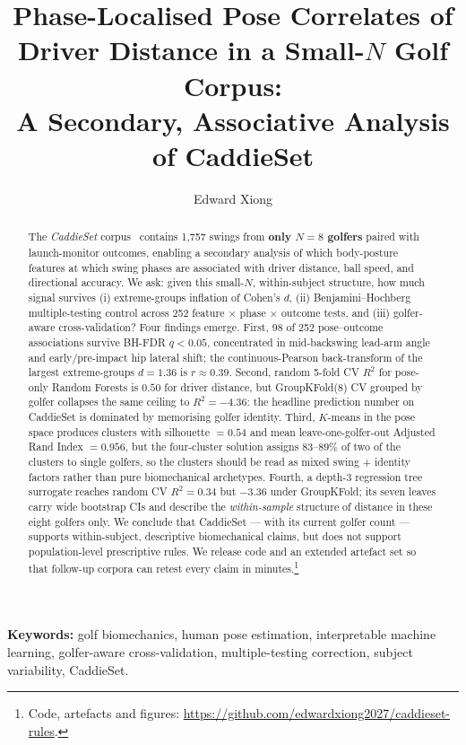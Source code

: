 \documentclass[11pt,a4paper]{article}
\title{\textbf{Phase-Localised Pose Correlates of Driver Distance in a Small-$N$ Golf Corpus:\\[2pt]
A Secondary, Associative Analysis of CaddieSet}}
\author[1]{Edward Xiong}
\affil[1]{Independent Research}
\date{}
\begin{document}
\maketitle

\begin{abstract}
\noindent
The \emph{CaddieSet} corpus~\citep{jung2025caddieset} contains 1{,}757 swings from \textbf{only $N=8$ golfers}
paired with launch-monitor outcomes, enabling a secondary analysis of which body-posture features at which swing
phases are associated with driver distance, ball speed, and directional accuracy.  We ask: given this small-$N$,
within-subject structure, how much signal survives (i) extreme-groups inflation of Cohen's $d$, (ii)
Benjamini--Hochberg multiple-testing control across 252 feature $\times$ phase $\times$ outcome tests, and
(iii) golfer-aware cross-validation?  Four findings emerge.  First, 98 of 252 pose--outcome associations survive
BH-FDR $q<0.05$, concentrated in mid-backswing lead-arm angle and early/pre-impact hip lateral shift; the
continuous-Pearson back-transform of the largest extreme-groups $d=1.36$ is $r\approx0.39$.  Second, random
5-fold CV $R^2$ for pose-only Random Forests is $0.50$ for driver distance, but GroupKFold(8) CV grouped by
golfer collapses the same ceiling to $R^2=-4.36$: the headline prediction number on CaddieSet is dominated by
memorising golfer identity.  Third, $K$-means in the pose space produces clusters with silhouette $=0.54$ and
mean leave-one-golfer-out Adjusted Rand Index $=0.956$, but the four-cluster solution assigns $83$--$89\%$ of
two of the clusters to single golfers, so the clusters should be read as mixed swing + identity factors rather
than pure biomechanical archetypes.  Fourth, a depth-3 regression tree surrogate reaches random CV $R^2=0.34$
but $-3.36$ under GroupKFold; its seven leaves carry wide bootstrap CIs and describe the \emph{within-sample}
structure of distance in these eight golfers only.  We conclude that CaddieSet --- with its current golfer
count --- supports within-subject, descriptive biomechanical claims, but does not support population-level
prescriptive rules.  We release code and an extended artefact set so that follow-up corpora can retest every
claim in minutes.\footnote{Code, artefacts and figures:
\url{https://github.com/edwardxiong2027/caddieset-rules}.}
\end{abstract}

\vspace{0.8em}
\begin{center}
\begin{tcolorbox}[colback=gray!5,colframe=gray!40,width=0.96\linewidth]
\small
\textbf{Keywords:} golf biomechanics, human pose estimation, interpretable machine learning, golfer-aware
cross-validation, multiple-testing correction, subject variability, CaddieSet.
\end{tcolorbox}
\end{center}
\end{document}
